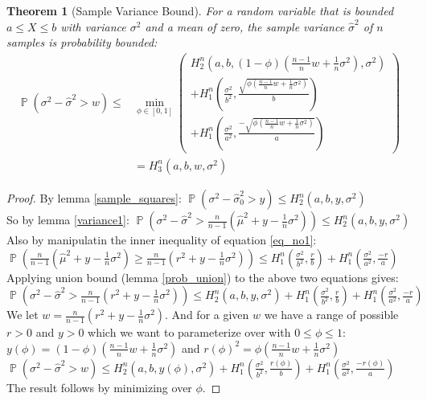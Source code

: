 \documentclass[aap,preprint]{imsart}
\newtheorem{theorem}{Theorem}
\DeclareMathOperator{\p}{\mathbb{P}}
\begin{document}
\begin{theorem}[Sample Variance Bound]\label{variance2}
For a random variable that is bounded $a\le X\le b$ with variance $\sigma^2$ and a mean of zero, the sample variance $\hat{\sigma}^2$ of $n$ samples is probability bounded:
\begin{align}\label{eq_no8} \p(\sigma^2 - \hat{\sigma}^2 > w)\le &\min_{\phi\in[0,1]}
\begin{pmatrix}
	H_2^n\left(a,b,(1-\phi)(\frac{n-1}{n}w+\frac{1}{n}\sigma^2),\sigma^2\right)\\
	+H_1^n\left(\frac{\sigma^2}{b^2},\frac{\sqrt{\phi(\frac{n-1}{n}w+\frac{1}{n}\sigma^2)}}{b}\right)\quad\quad\\
	+H_1^n\left(\frac{\sigma^2}{a^2},\frac{-\sqrt{\phi(\frac{n-1}{n}w+\frac{1}{n}\sigma^2)}}{a}\right)
\end{pmatrix} \\
&=H_3^n(a,b,w,\sigma^2)\nonumber\end{align}
\end{theorem}
\begin{proof}
By lemma \ref{sample_squares}: $\p(\sigma^2 - \hat{\sigma}_0^2> y) \le H_2^n(a,b,y,\sigma^2)$\\
So by lemma \ref{variance1}: $\p\left(\sigma^2 - \hat{\sigma}^2 > \frac{n}{n-1}\left(\hat{\mu}^2+y-\frac{1}{n}\sigma^2\right)\right) \le H_2^n(a,b,y,\sigma^2)$\\
Also by manipulatin the inner inequality of equation \ref{eq_no1}: \\$\p\left(\frac{n}{n-1}\left(\hat{\mu}^2+y-\frac{1}{n}\sigma^2\right)\ge \frac{n}{n-1}\left(r^2+y-\frac{1}{n}\sigma^2\right)\right)\le H_1^n\left(\frac{\sigma^2}{b^2},\frac{r}{b}\right)+H_1^n\left(\frac{\sigma^2}{a^2},\frac{-r}{a}\right)$\\
Applying union bound (lemma \ref{prob_union}) to the above two equations gives:\\
$\p\left(\sigma^2 - \hat{\sigma}^2 > \frac{n}{n-1}\left(r^2+y-\frac{1}{n}\sigma^2\right)\right) \le H_2^n(a,b,y,\sigma^2)+H_1^n\left(\frac{\sigma^2}{b^2},\frac{r}{b}\right)+H_1^n\left(\frac{\sigma^2}{a^2},\frac{-r}{a}\right)$\\
We let $w=\frac{n}{n-1}\left(r^2+y-\frac{1}{n}\sigma^2\right)$. And for a given $w$ we have a range of possible $r>0$ and $y>0$ which we want to parameterize over with $0\le\phi\le 1$:\\
$y(\phi) = (1-\phi)\left(\frac{n-1}{n}w+\frac{1}{n}\sigma^2\right)$ and
$r(\phi)^2 = \phi\left(\frac{n-1}{n}w+\frac{1}{n}\sigma^2\right)$\\
$\p\left(\sigma^2 - \hat{\sigma}^2 > w\right) \le H_2^n(a,b,y(\phi),\sigma^2)+H_1^n\left(\frac{\sigma^2}{b^2},\frac{r(\phi)}{b}\right)+H_1^n\left(\frac{\sigma^2}{a^2},\frac{-r(\phi)}{a}\right)$\\
The result follows by minimizing over $\phi$.
\end{proof}
\end{document}
